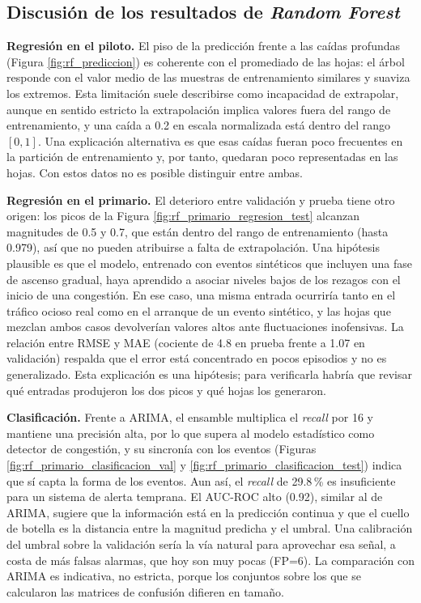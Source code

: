 \documentclass[12pt]{report}
\begin{document}
\subsection*{Discusión de los resultados de \textit{Random Forest}}

\textbf{Regresión en el piloto.} El piso de la predicción frente a las caídas profundas (Figura \ref{fig:rf_prediccion}) es coherente con el promediado de las hojas: el árbol responde con el valor medio de las muestras de entrenamiento similares y suaviza los extremos. Esta limitación suele describirse como incapacidad de extrapolar, aunque en sentido estricto la extrapolación implica valores fuera del rango de entrenamiento, y una caída a 0.2 en escala normalizada está dentro del rango $[0,1]$. Una explicación alternativa es que esas caídas fueran poco frecuentes en la partición de entrenamiento y, por tanto, quedaran poco representadas en las hojas. Con estos datos no es posible distinguir entre ambas.

\textbf{Regresión en el primario.} El deterioro entre validación y prueba tiene otro origen: los picos de la Figura \ref{fig:rf_primario_regresion_test} alcanzan magnitudes de 0.5 y 0.7, que están dentro del rango de entrenamiento (hasta 0.979), así que no pueden atribuirse a falta de extrapolación. Una hipótesis plausible es que el modelo, entrenado con eventos sintéticos que incluyen una fase de ascenso gradual, haya aprendido a asociar niveles bajos de los rezagos con el inicio de una congestión. En ese caso, una misma entrada ocurriría tanto en el tráfico ocioso real como en el arranque de un evento sintético, y las hojas que mezclan ambos casos devolverían valores altos ante fluctuaciones inofensivas. La relación entre RMSE y MAE (cociente de 4.8 en prueba frente a 1.07 en validación) respalda que el error está concentrado en pocos episodios y no es generalizado. Esta explicación es una hipótesis; para verificarla habría que revisar qué entradas produjeron los dos picos y qué hojas los generaron.

\textbf{Clasificación.} Frente a ARIMA, el ensamble multiplica el \textit{recall} por 16 y mantiene una precisión alta, por lo que supera al modelo estadístico como detector de congestión, y su sincronía con los eventos (Figuras \ref{fig:rf_primario_clasificacion_val} y \ref{fig:rf_primario_clasificacion_test}) indica que sí capta la forma de los eventos. Aun así, el \textit{recall} de 29.8\,\% es insuficiente para un sistema de alerta temprana. El AUC-ROC alto (0.92), similar al de ARIMA, sugiere que la información está en la predicción continua y que el cuello de botella es la distancia entre la magnitud predicha y el umbral. Una calibración del umbral sobre la validación sería la vía natural para aprovechar esa señal, a costa de más falsas alarmas, que hoy son muy pocas (FP=6). La comparación con ARIMA es indicativa, no estricta, porque los conjuntos sobre los que se calcularon las matrices de confusión difieren en tamaño.
\end{document}
